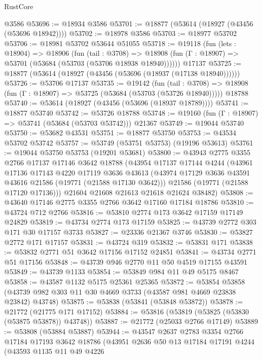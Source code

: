 \begin{lexlean}{RustCore}
\begin{coremodule}
    @3586
@53696 := @18934 @3586
@53701 := @18877 (@53614 (@18927 (@43456 (@53696 @18942))))
@53702 := @18978 @3586
@53703 := @18977 @53702
@53706 := @18981 @53702 @53644 @51055
@53718 := @19118
    (fun (lets : @18904) =>
    @18906
      (fun (tail : @3708) =>
      @18908 (fun (Γ : @18907) => @53701 (@53684 (@53703 (@53706 @18938 @18940))))))
    @17137
@53725 := @18877 (@53614 (@18927 (@43456 (@53696 (@18937 (@17138 @18940))))))
@53726 := @53706 @17137
@53735 := @19142
    (fun (tail : @3708) => @18908 (fun (Γ : @18907) => @53725 (@53684 (@53703 (@53726 @18940)))))
    @18788
@53740 := @53614 (@18927 (@43456 (@53696 (@18937 @18789))))
@53741 := @18877 @53740
@53742 := @53726 @18788
@53748 := @19160 (fun (Γ : @18907) => @53741 (@53684 (@53703 @53742))) @21367
@53749 := @19044 @53740
@53750 := @53682 @43531
@53751 := @18877 @53750
@53753 := @43534 @53702 @53742
@53757 := @53749 (@53751 @53753) (@19196 @53613)
@53761 := @19044 @53750 @53753 (@19201 @53681)
@53800 := @43943
    @2775
    @3355
    @2766
    @17137
    @17146
    @3642
    @18788
    (@43954
      @17137
      @17144
      @4244
      (@43961
        @17136
        @17143
        @4220
        @17119
        @3636
        @43613
        (@43974 @17129 @3636 @43591 @43616 @21586 (@19771 (@21588 @17130 @3642)))
        @21586
        (@19771 (@21588 @17120 @17136)))
      @21604
      @21608
      @21613
      @21618
      @21624
      @38482)
@53808 := @43640 @17146 @2775 @3355 @2766 @3642 @17160 @17184 @18786
@53810 := @43724 @712 @2766
@53816 := @53810 @2774 @173 @3642 @17159 @17149 @24829
@53819 := @43734 @2774 @173 @17159
@53825 := @43739 @2772 @303 @171 @30 @17157 @3733
@53827 := @23336 @21367 @3746
@53830 := @53827 @2772 @171 @17157
@53831 := @43724 @319
@53832 := @53831 @171
@53838 := @53832 @2771 @51 @3642 @17156 @17152 @24851
@53841 := @43734 @2771 @51 @17156
@53848 := @43739 @946 @2770 @11 @50 @4519 @17155 @43591
@53849 := @43739 @1133
@53854 := @53849 @984 @11 @49 @5175 @8467
@53858 := @43587 @1132 @5175 @25361 @25365
@53872 := @53854
    @53858
    (@43739 @982 @303 @11 @30 @4669 @3733 (@43587 @981 @4669 @23838 @23842) @43748)
@53875 := @53838 (@53841 (@53848 @53872))
@53878 := @21772 (@21775 @171 @17152)
@53884 := @53816 (@53819 (@53825 (@53830 (@53875 @53878)) @43748))
@53887 := @21772 (@25033 @2766 @17149)
@53889 := @53808 (@53884 @53887)
@53944 := @43547
    @2637
    @2783
    @3354
    @2766
    @17184
    @17193
    @3642
    @18786
    (@43951
      @2636
      @50
      @13
      @17184
      @17191
      @4244
      (@43593
        @1135
        @11
        @49
        @4226

\end{coremodule}
\end{lexlean}
